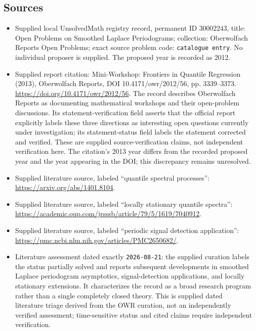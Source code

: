 \documentclass[11pt]{article}
\begin{document}
\subsection{Sources}
\begin{itemize}
\item Supplied local UnsolvedMath registry record, permanent ID \(30002243\), title: Open Problems on Smoothed Laplace Periodograms; collection: Oberwolfach Reports Open Problems; exact source problem code: \texttt{catalogue entry}. No individual proposer is supplied. The proposed year is recorded as 2012.
\item Supplied report citation: Mini-Workshop: Frontiers in Quantile Regression (2013), Oberwolfach Reports, DOI 10.4171/owr/2012/56, pp. 3339--3373. \url{https://doi.org/10.4171/owr/2012/56}. The record describes Oberwolfach Reports as documenting mathematical workshops and their open-problem discussions. Its statement-verification field asserts that the official report explicitly labels these three directions as interesting open questions currently under investigation; its statement-status field labels the statement corrected and verified. These are supplied source-verification claims, not independent verification here. The citation's 2013 year differs from the recorded proposed year and the year appearing in the DOI; this discrepancy remains unresolved.
\item Supplied literature source, labeled ``quantile spectral processes'': \url{https://arxiv.org/abs/1401.8104}.
\item Supplied literature source, labeled ``locally stationary quantile spectra'': \url{https://academic.oup.com/jrsssb/article/79/5/1619/7040912}.
\item Supplied literature source, labeled ``periodic signal detection application'': \url{https://pmc.ncbi.nlm.nih.gov/articles/PMC2650682/}.
\item Literature assessment dated exactly \texttt{2026-08-21}: the supplied curation labels the status partially solved and reports subsequent developments in smoothed Laplace periodogram asymptotics, signal-detection applications, and locally stationary extensions. It characterizes the record as a broad research program rather than a single completely closed theory. This is supplied dated literature triage derived from the OWR curation, not an independently verified assessment; time-sensitive status and cited claims require independent verification.
\end{itemize}
\end{document}
